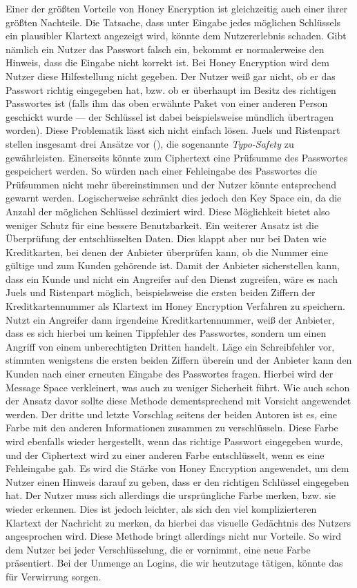 Einer der größten Vorteile von Honey Encryption ist gleichzeitig auch einer ihrer größten Nachteile. Die Tatsache, dass unter Eingabe jedes möglichen Schlüssels ein plausibler Klartext angezeigt wird, könnte dem Nutzererlebnis schaden. Gibt nämlich ein Nutzer das Passwort falsch ein, bekommt er normalerweise den Hinweis, dass die Eingabe nicht korrekt ist. Bei Honey Encryption wird dem Nutzer diese Hilfestellung nicht gegeben. Der Nutzer weiß gar nicht, ob er das Passwort richtig eingegeben hat, bzw. ob er überhaupt im Besitz des richtigen Passwortes ist (falls ihm das oben erwähnte Paket von einer anderen Person geschickt wurde --- der Schlüssel ist dabei beispielsweise mündlich übertragen worden). Diese Problematik lässt sich nicht einfach lösen. Juels und Ristenpart stellen insgesamt drei Ansätze vor (\cite{CRCS2014, EURO2014}), die sogenannte \emph{Typo-Safety} zu gewährleisten. Einerseits könnte zum Ciphertext eine Prüfsumme des Passwortes gespeichert werden. So würden nach einer Fehleingabe des Passwortes die Prüfsummen nicht mehr übereinstimmen und der Nutzer könnte entsprechend gewarnt werden. Logischerweise schränkt dies jedoch den Key Space ein, da die Anzahl der möglichen Schlüssel dezimiert wird. Diese Möglichkeit bietet also weniger Schutz für eine bessere Benutzbarkeit. Ein weiterer Ansatz ist die Überprüfung der entschlüsselten Daten. Dies klappt aber nur bei Daten wie Kreditkarten, bei denen der Anbieter überprüfen kann, ob die Nummer eine gültige und zum Kunden gehörende ist. Damit der Anbieter sicherstellen kann, dass ein Kunde und nicht ein Angreifer auf den Dienst zugreifen, wäre es nach Juels und Ristenpart möglich, beispielsweise die ersten beiden Ziffern der Kreditkartennummer als Klartext im Honey Encryption Verfahren zu speichern. Nutzt ein Angreifer dann irgendeine Kreditkartennummer, weiß der Anbieter, dass es sich hierbei um keinen Tippfehler des Passwortes, sondern um einen Angriff von einem unberechtigten Dritten handelt. Läge ein Schreibfehler vor, stimmten wenigstens die ersten beiden Ziffern überein und der Anbieter kann den Kunden nach einer erneuten Eingabe des Passwortes fragen. Hierbei wird der Message Space verkleinert, was auch zu weniger Sicherheit führt. Wie auch schon der Ansatz davor sollte diese Methode dementsprechend mit Vorsicht angewendet werden. Der dritte und letzte Vorschlag seitens der beiden Autoren ist es, eine Farbe mit den anderen Informationen zusammen zu verschlüsseln. Diese Farbe wird ebenfalls wieder hergestellt, wenn das richtige Passwort eingegeben wurde, und der Ciphertext wird zu einer anderen Farbe entschlüsselt, wenn es eine Fehleingabe gab. Es wird die Stärke von Honey Encryption angewendet, um dem Nutzer einen Hinweis darauf zu geben, dass er den richtigen Schlüssel eingegeben hat. Der Nutzer muss sich allerdings die ursprüngliche Farbe merken, bzw. sie wieder erkennen. Dies ist jedoch leichter, als sich den viel komplizierteren Klartext der Nachricht zu merken, da hierbei das visuelle Gedächtnis des Nutzers angesprochen wird. Diese Methode bringt allerdings nicht nur Vorteile. So wird dem Nutzer bei jeder Verschlüsselung, die er vornimmt, eine neue Farbe präsentiert. Bei der Unmenge an Logins, die wir heutzutage tätigen, könnte das für Verwirrung sorgen.

\newpage
